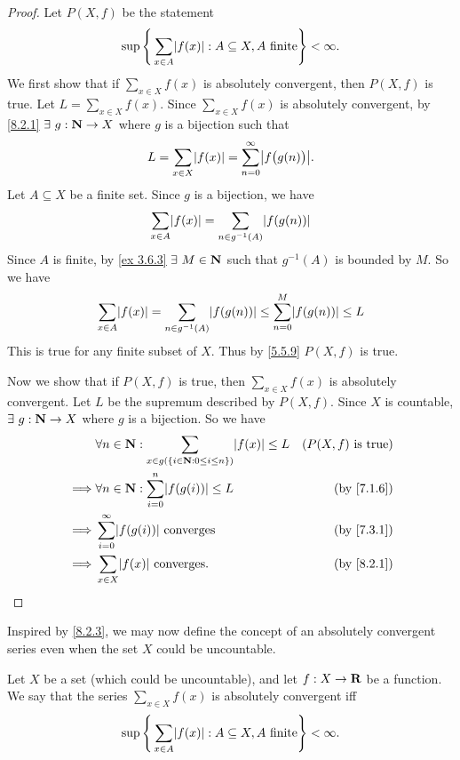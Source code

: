 \begin{proof}
  Let \(P(X, f)\) be the statement
  \[
    \sup\Bigg\{\sum_{x \in A} \abs{f(x)} : A \subseteq X, A \text{ finite}\Bigg\} < \infty.
  \]
  We first show that if \(\sum_{x \in X} f(x)\) is absolutely convergent, then \(P(X, f)\) is true.
  Let \(L = \sum_{x \in X} f(x)\).
  Since \(\sum_{x \in X} f(x)\) is absolutely convergent, by \cref{8.2.1} \(\exists\ g : \mathbf{N} \to X\) where \(g\) is a bijection such that
  \[
    L = \sum_{x \in X} \abs{f(x)} = \sum_{n = 0}^\infty \abs{f\big(g(n)\big)}.
  \]
  Let \(A \subseteq X\) be a finite set.
  Since \(g\) is a bijection, we have
  \[
    \sum_{x \in A} \abs{f(x)} = \sum_{n \in g^{-1}(A)} \abs{f(g(n))}
  \]
  Since \(A\) is finite, by \cref{ex 3.6.3} \(\exists\ M \in \mathbf{N}\) such that \(g^{-1}(A)\) is bounded by \(M\).
  So we have
  \[
    \sum_{x \in A} \abs{f(x)} = \sum_{n \in g^{-1}(A)} \abs{f(g(n))} \leq \sum_{n = 0}^M \abs{f(g(n))} \leq L
  \]
  This is true for any finite subset of \(X\).
  Thus by \cref{5.5.9} \(P(X, f)\) is true.

  Now we show that if \(P(X, f)\) is true, then \(\sum_{x \in X} f(x)\) is absolutely convergent.
  Let \(L\) be the supremum described by \(P(X, f)\).
  Since \(X\) is countable, \(\exists\ g : \mathbf{N} \to X\) where \(g\) is a bijection.
  So we have
  \begin{align*}
             & \forall n \in \N : \sum_{x \in g(\{i \in \N : 0 \leq i \leq n\})} \abs{f(x)} \leq L & (P(X, f) \text{ is true}) \\
    \implies & \forall n \in \N : \sum_{i = 0}^n \abs{f(g(i))} \leq L                              & \text{(by \cref{7.1.6})}  \\
    \implies & \sum_{i = 0}^\infty \abs{f(g(i))} \text{ converges}                                 & \text{(by \cref{7.3.1})}  \\
    \implies & \sum_{x \in X} \abs{f(x)} \text{ converges}.                                        & \text{(by \cref{8.2.1})}
  \end{align*}
\end{proof}

\begin{note}
  Inspired by \cref{8.2.3}, we may now define the concept of an absolutely convergent series even when the set \(X\) could be uncountable.
\end{note}

\begin{definition}\label{8.2.4}
  Let \(X\) be a set (which could be uncountable), and let \(f : X \to \mathbf{R}\) be a function.
  We say that the series \(\sum_{x \in X} f(x)\) is absolutely convergent iff
  \[
    \sup\Bigg\{\sum_{x \in A} \abs{f(x)} : A \subseteq X, A \text{ finite}\Bigg\} < \infty.
  \]
\end{definition}

